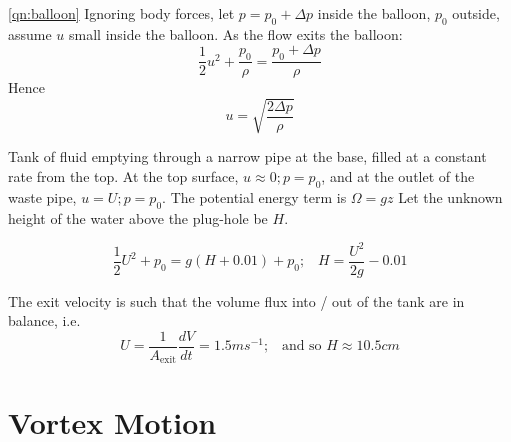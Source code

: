 \documentclass[10pt]{report}
\begin{document}
\begin{answer3}
\begin{questionnumber}{\ref{qn:balloon}}
Ignoring body forces, let $p=p_{0} + \Delta p$ inside the balloon, $p_{0}$ outside,
assume $u$ small inside the balloon. As the flow exits the balloon:
\[
   \frac{1}{2}u^{2} + \frac{p_{0}}{\rho} = \frac{p_{0}+\Delta p}{\rho}
\]
Hence
\[
   u = \sqrt{ \frac{2\Delta p}{\rho} }
\]

Tank of fluid emptying through a narrow pipe at the base, filled at a constant rate from
the top. At the top surface, $u \approx 0; p=p_{0}$, and at the outlet of the waste pipe,
$u = U; p=p_{0}$. The potential energy term is $\Omega = gz$
Let the unknown height of the water above the plug-hole be $H$.

\[
	\frac{1}{2}U^{2} + p_{0} = g(H+0.01) + p_{0};\;\;\;  H = \frac{U^{2}}{2g} - 0.01
\]

The exit velocity is such that the volume flux into / out of the tank are in balance, i.e.
\[
	U = \frac{1}{A_{\text{exit}}}\frac{dV}{dt} = 1.5 ms^{-1}; \;\;\; \text{and so } H \approx 10.5cm
\]
\end{questionnumber}






\end{answer3}




\chapter{Vortex Motion}

\begin{figure}
\label{fig9a}
\end{figure}
\end{document}
